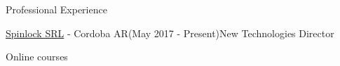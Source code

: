 \documentclass{resume}
\begin{document}
\begin{rSection}{Professional Experience}
\begin{rSubsection}{\href{https://spinlock.com.ar}{Spinlock SRL} - Cordoba AR}{(May 2017 - Present)}{New Technologies Director}{}






\begin{rSection}{Online courses} %


\end{rSection}
\end{rSubsection}
\end{rSection}
\end{document}
